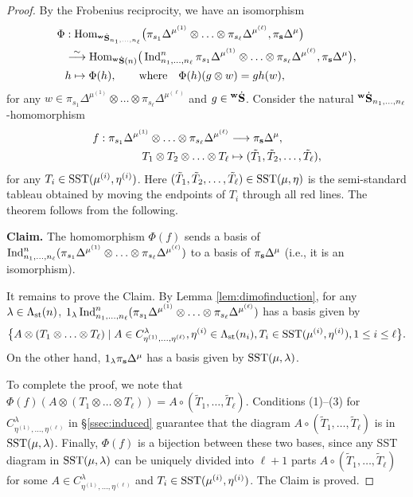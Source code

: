 \begin{proof}
   By the Frobenius reciprocity, we have an isomorphism
\begin{align*}
\Phi &: {\rm Hom}_{{}^{\bold{w}}\dot{\bold{S}}_{n_1,\ldots,n_\ell}}\big(\pi_{s_1} \Delta^{\mu^{(1)}}\otimes\ldots \otimes \pi_{s_\ell} \Delta^{\mu^{(\ell)}}, \pi_{\mathbf{s}} \Delta^{\mu} \big)\\
&\stackrel{\sim}{\longrightarrow} {\rm Hom}_{{}^{\bold{w}}\dot{\bold{S}}(n)}\big(\operatorname{Ind}\nolimits_{n_1,\ldots,n_\ell}^n \pi_{s_1} \Delta^{\mu^{(1)}}\otimes\ldots \otimes \pi_{s_\ell} \Delta^{\mu^{(\ell)}}, \pi_{\mathbf{s}} \Delta^{\mu}\big),
\\
& h \mapsto \Phi(h), \qquad \text{where}\quad \Phi(h)(g\otimes w )= gh(w),
\end{align*} 
for any $w\in \pi_{s_1} \Delta^{\mu^{(1)}}\otimes\ldots \otimes \pi_{s_\ell} \Delta^{\mu^{(\ell)}}$ and $g\in {}^{\bold{w}}\dot{\bold{S}}$. Consider the natural ${}^{\bold{w}}\dot{\bold{S}}_{n_1,\ldots,n_\ell}$-homomorphism 
\begin{align*}
    f: \pi_{s_1} \Delta^{\mu^{(1)}}\otimes\ldots \otimes \pi_{s_\ell} \Delta^{\mu^{(\ell)}}&\longrightarrow  \pi_{\mathbf{s}} \Delta^{\mu}, \\
     T_1\otimes T_2\otimes \ldots\otimes T_\ell &\mapsto (\tilde T_1,\tilde T_2,\ldots,\tilde T_\ell),
   \end{align*} 
   for any $T_i\in \text{SST}(\mu^{(i)},\eta^{(i)})$.
   Here $(\tilde T_1,\tilde T_2,\ldots, \tilde T_\ell)\in \text{SST}(\mu,\eta)$ is the semi-standard tableau
   obtained by moving the endpoints of   $T_i$   through all red lines. The theorem follows from the following.
   \vspace{2mm}
   
{\bf Claim.} The homomorphism 
$\Phi(f)$ sends 
   a basis of $\operatorname{Ind}\nolimits_{n_1,\ldots,n_\ell}^n (\pi_{s_1} \Delta^{\mu^{(1)}} \otimes\ldots \otimes \pi_{s_\ell} \Delta^{\mu^{(\ell)}})$
   to a basis of $\pi_{\mathbf{s}} \Delta^{\mu}$
(i.e., it is an isomorphism).
   
It remains to prove the Claim. By Lemma \ref{lem:dimofinduction}, for any $\lambda\in \Lambda_{\text{st}}(n)$, 
$1_\lambda\operatorname{Ind}\nolimits_{n_1,\ldots,n_\ell}^n (\pi_{s_1} \Delta^{\mu^{(1)}}\otimes\ldots \otimes \pi_{s_\ell} \Delta^{\mu^{(\ell)}})$
has a basis given by 
\[
\big\{ A\otimes (T_1\otimes \ldots\otimes T_\ell) \mid A\in C^\lambda_{\eta^{(1)},\ldots,\eta^{(\ell)}}, \eta^{(i)}\in \Lambda_{\text{st}}(n_i), T_i\in \text{SST}(\mu^{(i)},\eta^{(i)}), 1\le i\le \ell \big\}.
\]
On the other hand, $1_\lambda \pi_{\mathbf{s}} \Delta^{\mu} $  has a basis given by  $\text{SST}(\mu,\lambda)$. 

 To complete the proof, we note that 
 $\Phi(f)(A\otimes (T_1\otimes \ldots\otimes T_\ell))= A\circ (\tilde T_1,\ldots, \tilde T_\ell)  .$
 Conditions (1)--(3) for $C^\lambda_{\eta^{(1)},\ldots,\eta^{(\ell)}}$ in \S\ref{ssec:induced}
 guarantee that the diagram $A\circ (\tilde T_1,\ldots, \tilde T_\ell)$ is in 
 $\text{SST}(\mu,\lambda)$. Finally,  $\Phi(f)$ is a bijection between these two bases, since any SST diagram in $\text{SST}(\mu,\lambda)$ can be uniquely  divided  into 
 $\ell+1$ parts $ A\circ (\tilde T_1,\ldots, \tilde T_\ell )$ for some $A \in C^\lambda_{\eta^{(1)},\ldots,\eta^{(\ell)}}$ and $ T_i\in \text{SST}(\mu^{(i)},\eta^{(i)})$. The Claim is proved. 
\end{proof}


